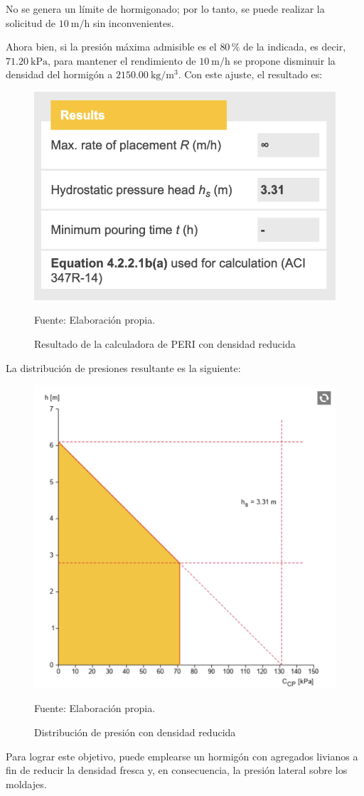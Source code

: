 No se genera un límite de hormigonado; por lo tanto, se puede realizar la solicitud de \(10~\mathrm{m/h}\) sin inconvenientes.

Ahora bien, si la presión máxima admisible es el \(80\,\%\) de la indicada, es decir, \(71.20~\mathrm{kPa}\), para mantener el rendimiento de \(10~\mathrm{m/h}\) se propone disminuir la densidad del hormigón a \(2150.00~\mathrm{kg/m^3}\). Con este ajuste, el resultado es:

\begin{figure}[H]
    \centering
    \includegraphics[width=0.50\linewidth]{max_rate.png}
    \caption{Resultado de la calculadora de PERI con densidad reducida}
Fuente: Elaboración propia.

\end{figure}

La distribución de presiones resultante es la siguiente:

\begin{figure}[H]
    \centering
    \includegraphics[width=0.50\linewidth]{presiones_2.png}
    \caption{Distribución de presión con densidad reducida}
Fuente: Elaboración propia.

\end{figure}

Para lograr este objetivo, puede emplearse un hormigón con agregados livianos a fin de reducir la densidad fresca y, en consecuencia, la presión lateral sobre los moldajes.


